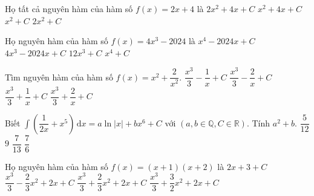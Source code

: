 \begin{ex}%
	Họ tất cả nguyên hàm của hàm số $f(x)=2x+4$ là
	\choice
	{$2x^2+4x+C$}
	{\True $x^2+4x+C$}
	{$x^2+C$}
	{$2x^2+C$}
	
\end{ex}

\begin{ex}
	Họ nguyên hàm của hàm số $f(x)=4x^{3}-2024$ là
	\choice
	{\True $x^{4}-2024x+C$}
	{$4x^{3}-2024x+C$}
	{$12x^{3}+C$}
	{$x^{4}+C$}
\end{ex}


\begin{ex}
	Tìm nguyên hàm của hàm số $f(x)=x^2+\dfrac{2}{x^2}$.
	\choice
	{$\dfrac{x^3}{3}-\dfrac{1}{x}+C$}
	{\True $\dfrac{x^3}{3}-\dfrac{2}{x}+C$}
	{$\dfrac{x^3}{3}+\dfrac{1}{x}+C$}
	{$\dfrac{x^3}{3}+\dfrac{2}{x}+C$}
\end{ex}

\begin{ex}
	Biết $\displaystyle\int \left(\dfrac{1}{2x}+x^5\right)\mathrm{\,d}x=a\ln \left|x\right|+bx^6+C$ với $\left(a,b\in \mathbb{Q},C\in \mathbb{R}\right)$. Tính $a^2+b$.
	\choice
	{\True $\dfrac{5}{12}$}
	{$9$}
	{$\dfrac{7}{13}$}
	{$\dfrac{7}{6}$}
\end{ex}

\begin{ex}
	Họ nguyên hàm của hàm số $f(x)=(x+1)(x+2)$ là
	\choice
	{$2x+3+C$}
	{$\dfrac{x^3}{3}-\dfrac{2}{3}x^2+2x+C$}
	{$\dfrac{x^3}{3}+\dfrac{2}{3}x^2+2x+C$}
	{\True $\dfrac{x^3}{3}+\dfrac{3}{2}x^2+2x+C$}
\end{ex}

